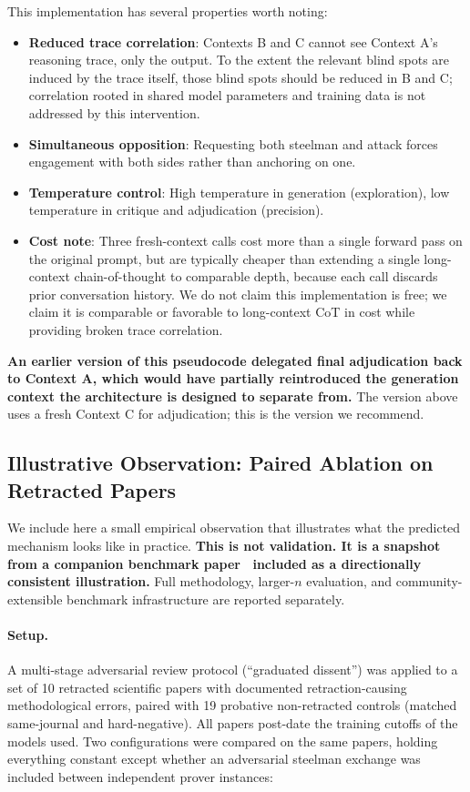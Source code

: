 \documentclass[11pt]{article}
\begin{document}
This implementation has several properties worth noting:
\begin{itemize}
    \item \textbf{Reduced trace correlation}: Contexts B and C cannot see Context A's reasoning trace, only the output. To the extent the relevant blind spots are induced by the trace itself, those blind spots should be reduced in B and C; correlation rooted in shared model parameters and training data is not addressed by this intervention.
    \item \textbf{Simultaneous opposition}: Requesting both steelman and attack forces engagement with both sides rather than anchoring on one.
    \item \textbf{Temperature control}: High temperature in generation (exploration), low temperature in critique and adjudication (precision).
    \item \textbf{Cost note}: Three fresh-context calls cost more than a single forward pass on the original prompt, but are typically cheaper than extending a single long-context chain-of-thought to comparable depth, because each call discards prior conversation history. We do not claim this implementation is free; we claim it is comparable or favorable to long-context CoT in cost while providing broken trace correlation.
\end{itemize}

\textbf{An earlier version of this pseudocode delegated final adjudication back to Context A, which would have partially reintroduced the generation context the architecture is designed to separate from.} The version above uses a fresh Context C for adjudication; this is the version we recommend.

\subsection{Illustrative Observation: Paired Ablation on Retracted Papers}
\label{sec:illustration}

We include here a small empirical observation that illustrates what the predicted mechanism looks like in practice. \textbf{This is not validation. It is a snapshot from a companion benchmark paper~\citep{brilliant2026benchmark} included as a directionally consistent illustration.} Full methodology, larger-$n$ evaluation, and community-extensible benchmark infrastructure are reported separately.

\paragraph{Setup.} A multi-stage adversarial review protocol (``graduated dissent'') was applied to a set of 10 retracted scientific papers with documented retraction-causing methodological errors, paired with 19 probative non-retracted controls (matched same-journal and hard-negative). All papers post-date the training cutoffs of the models used. Two configurations were compared on the same papers, holding everything constant except whether an adversarial steelman exchange was included between independent prover instances:
\end{document}
